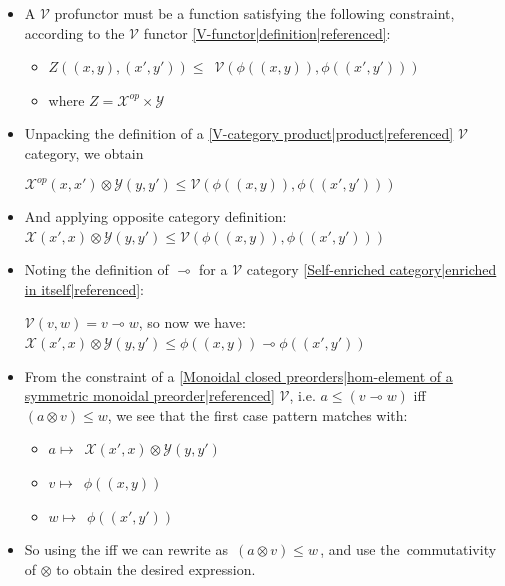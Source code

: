 \begin{itemize}
    \item   A $\mathcal{V}$ profunctor must be a function satisfying the following constraint, according to the $\mathcal{V}$ functor \ref{V-functor|definition|referenced}:
      \begin{itemize}
      \item $Z((x,y),(x',y')) \leq$ \,$\mathcal{V}(\phi((x,y)),\phi((x',y')))$\,
      \item where $Z = \mathcal{X}^{op}\times \mathcal{Y}$
      \end{itemize}

      \item Unpacking the definition of a \ref{V-category product|product|referenced}  $\mathcal{V}$ category, we obtain

    $\mathcal{X}^{op}(x,x') \otimes \mathcal{Y}(y,y') \leq \mathcal{V}(\phi((x,y)),\phi((x',y')))$

    \item And applying opposite category definition: \,$\mathcal{X}(x',x) \otimes \mathcal{Y}(y,y') \leq \mathcal{V}(\phi((x,y)),\phi((x',y')))$\,

    \item Noting the definition of $\multimap$ for a $\mathcal{V}$ category \ref{Self-enriched category|enriched in itself|referenced}:

    $\mathcal{V}(v,w)=v\multimap w$, so now we have: \,$\mathcal{X}(x',x) \otimes \mathcal{Y}(y,y') \leq \phi((x,y)) \multimap \phi((x',y'))$\,

    \item From the constraint of a \ref{Monoidal closed preorders|hom-element of a symmetric monoidal preorder|referenced} $\mathcal{V}$, i.e. $a \leq (v \multimap w)$ iff $(a \otimes v) \leq w$, we see that the first case pattern matches with:
      \begin{itemize}
      \item $a \mapsto$ \,$\mathcal{X}(x',x) \otimes \mathcal{Y}(y,y')$\,
      \item $v \mapsto$ \,$\phi((x,y))$\,
      \item $w \mapsto$ \,$\phi((x',y'))$\,
      \end{itemize}
    \item So using the iff we can rewrite as \,$(a \otimes v) \leq w$\,, and use the \,commutativity\, of $\otimes$ to obtain the desired expression.
    \end{itemize}
